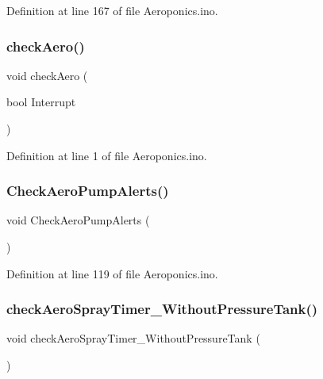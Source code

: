 Definition at line 167 of file Aeroponics.\+ino.

\mbox{\label{_aeroponics_8ino_a6739327a66088500872a8ae0595a7972}} 
\subsubsection{\texorpdfstring{checkAero()}{checkAero()}}
{\footnotesize\ttfamily void check\+Aero (\begin{DoxyParamCaption}\item[{bool}]{Interrupt }\end{DoxyParamCaption})}



Definition at line 1 of file Aeroponics.\+ino.

\mbox{\label{_aeroponics_8ino_a584e06ce44ecff2d0382e2d4d209e4c1}} 
\subsubsection{\texorpdfstring{CheckAeroPumpAlerts()}{CheckAeroPumpAlerts()}}
{\footnotesize\ttfamily void Check\+Aero\+Pump\+Alerts (\begin{DoxyParamCaption}{ }\end{DoxyParamCaption})}



Definition at line 119 of file Aeroponics.\+ino.

\mbox{\label{_aeroponics_8ino_ae996899811e505867b71dde23b21cb87}} 
\subsubsection{\texorpdfstring{checkAeroSprayTimer\_WithoutPressureTank()}{checkAeroSprayTimer\_WithoutPressureTank()}}
{\footnotesize\ttfamily void check\+Aero\+Spray\+Timer\+\_\+\+Without\+Pressure\+Tank (\begin{DoxyParamCaption}{ }\end{DoxyParamCaption})}



